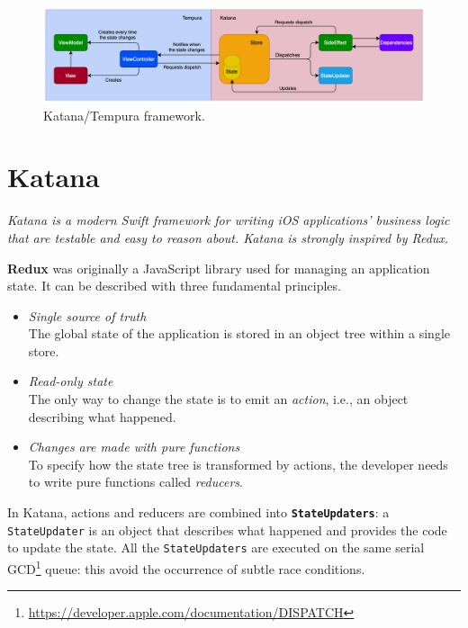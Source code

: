 \documentclass[a4paper, 11pt, parskip=half]{scrreprt}
\theoremstyle{definition}
\newenvironment{linedquote}{
	\begin{mdframed}[style=linedquote]
}{
	\end{mdframed}
}
\begin{document}
\begin{figure}[H]
    \centering
    \includegraphics[width=0.99\linewidth, keepaspectratio]{Katana-Tempura-light}
    \caption{Katana/Tempura framework.}
\end{figure}

\section{Katana}

\begin{linedquote}
    \textit{Katana is a modern Swift framework for writing iOS applications' business logic that are testable and easy to reason about. Katana is strongly inspired by Redux.}
\end{linedquote}

\textbf{Redux} was originally a JavaScript library used for managing an application state. It can be described with three fundamental principles.
\begin{itemize}
    \item \textit{Single source of truth} \\
    The global state of the application is stored in an object tree within a single store.
    \item \textit{Read-only state} \\
    The only way to change the state is to emit an \textit{action}, i.e., an object describing what happened.
    \item \textit{Changes are made with pure functions} \\
    To specify how the state tree is transformed by actions, the developer needs to write pure functions called \textit{reducers}.
\end{itemize}

In Katana, actions and reducers are combined into \textbf{\texttt{StateUpdaters}}: a \texttt{StateUpdater} is an object that describes what happened and provides the code to update the state. All the \texttt{StateUpdaters} are executed on the same serial GCD\footnote{\href{https://developer.apple.com/documentation/DISPATCH}{https://developer.apple.com/documentation/DISPATCH}} queue: this avoid the occurrence of subtle race conditions.
\end{document}

